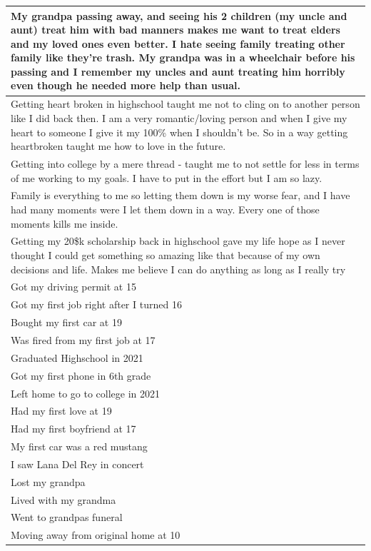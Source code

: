 \documentclass[
  .7em,
  letterpaper,
  DIV=11,
  numbers=noendperiod]{scrartcl}
\begin{document}
\begin{table}
\begin{tabular}{l}
\hline
My grandpa passing away, and seeing his 2 children (my uncle and aunt) treat him with bad manners makes me want to treat elders and my loved ones even better. I hate seeing family treating other family like they're trash. My grandpa was in a wheelchair before his passing and I remember my uncles and aunt treating him horribly even though he needed more help than usual.\\
\hline
Getting heart broken in highschool taught me not to cling on to another person like I did back then. I am a very romantic/loving person and when I give my heart to someone I give it my 100\% when I shouldn't be. So in a way getting heartbroken taught me how to love in the future.\\
\hline
Getting into college by a mere thread - taught me to not settle for less in terms of me working to my goals. I have to put in the effort but I am so lazy.\\
\hline
Family is everything to me so letting them down is my worse fear, and I have had many moments were I let them down in a way. Every one of those moments kills me inside.\\
\hline
Getting my 20\$k scholarship back in highschool gave my life hope as I never thought I could get something so amazing like that because of my own decisions and life. Makes me believe I can do anything as long as I really try\\
\hline
Got my driving permit at 15\\
\hline
Got my first job right after I turned 16\\
\hline
Bought my first car at 19\\
\hline
Was fired from my first job at 17\\
\hline
Graduated Highschool in 2021\\
\hline
Got my first phone in 6th grade\\
\hline
Left home to go to college in 2021\\
\hline
Had my first love at 19\\
\hline
Had my first boyfriend at 17\\
\hline
My first car was a red mustang\\
\hline
I saw Lana Del Rey in concert\\
\hline
Lost my grandpa\\
\hline
Lived with my grandma\\
\hline
Went to grandpas funeral\\
\hline
Moving away from original home at 10\\

\end{tabular}
\end{table}
\end{document}
